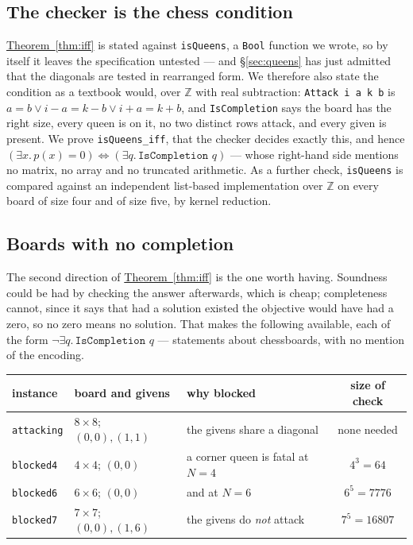 \documentclass{easychair}
\newcommand{\secref}[1]{\hyperref[#1]{\textcolor{academicpurple}{\S\ref*{#1}}}}
\newcommand{\thmref}[1]{\textcolor{academicpurple}{\hyperref[#1]{Theorem~\ref*{#1}}}}
\begin{document}
\subsection{The checker is the chess condition}

\thmref{thm:iff} is stated against \lstinline{isQueens}, a \lstinline{Bool} function we wrote, so by
itself it leaves the specification untested --- and \secref{sec:queens} has just admitted that the
diagonals are tested in rearranged form. We therefore also state the condition as a textbook would,
over $\mathbb{Z}$ with real subtraction: \lstinline{Attack i a k b} is
$a = b \vee i - a = k - b \vee i + a = k + b$, and \lstinline{IsCompletion} says the board has the
right size, every queen is on it, no two distinct rows attack, and every given is present. We prove
\lstinline{isQueens_iff}, that the checker decides exactly this, and hence
$(\exists x.\,p(x)=0) \iff (\exists q.\,\texttt{IsCompletion }q)$ --- whose right-hand side mentions
no matrix, no array and no truncated arithmetic. As a further check, \lstinline{isQueens} is compared
against an independent list-based implementation over $\mathbb{Z}$ on every board of size four and of
size five, by kernel reduction.

\subsection{Boards with no completion}

The second direction of \thmref{thm:iff} is the one worth having. Soundness could be had by checking
the answer afterwards, which is cheap; completeness cannot, since it says that had a solution existed
the objective would have had a zero, so no zero means no solution. That makes the following available,
each of the form $\neg\exists q.\,\texttt{IsCompletion }q$ --- statements about chessboards, with no
mention of the encoding.

\begin{center}\small
\begin{tabular}{@{}lllc@{}}
\toprule
instance & board and givens & why blocked & size of check\\
\midrule
\texttt{attacking} & $8\times8$; $(0,0),(1,1)$ & the givens share a diagonal & none needed\\
\texttt{blocked4}  & $4\times4$; $(0,0)$ & a corner queen is fatal at $N=4$ & $4^3 = 64$\\
\texttt{blocked6}  & $6\times6$; $(0,0)$ & and at $N=6$ & $6^5 = 7776$\\
\texttt{blocked7}  & $7\times7$; $(0,0),(1,6)$ & the givens do \emph{not} attack & $7^5 = 16807$\\
\bottomrule
\end{tabular}
\end{center}
\end{document}
